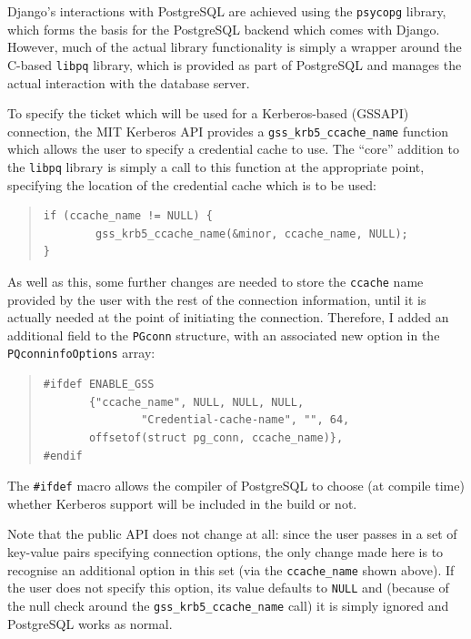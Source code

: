 \documentclass[12pt]{report}
\begin{document}
Django's interactions with PostgreSQL are achieved using the \texttt{psycopg} library, which forms the basis for the PostgreSQL backend which comes with Django. However, much of the actual library functionality is simply a wrapper around the C-based \texttt{libpq} library, which is provided as part of PostgreSQL and manages the actual interaction with the database server.

To specify the ticket which will be used for a Kerberos-based (GSSAPI) connection, the MIT Kerberos API provides a \verb+gss_krb5_ccache_name+ function which allows the user to specify a credential cache to use. The ``core'' addition to the \texttt{libpq} library is simply a call to this function at the appropriate point, specifying the location of the credential cache which is to be used:

\begin{quote}
\begin{verbatim}
if (ccache_name != NULL) {
        gss_krb5_ccache_name(&minor, ccache_name, NULL);
}
\end{verbatim}
\end{quote}

As well as this, some further changes are needed to store the \texttt{ccache} name provided by the user with the rest of the connection information, until it is actually needed at the point of initiating the connection. Therefore, I added an additional field to the \texttt{PGconn} structure, with an associated new option in the \texttt{PQconninfoOptions} array:

\begin{quote}
\begin{verbatim}
#ifdef ENABLE_GSS
       {"ccache_name", NULL, NULL, NULL,
               "Credential-cache-name", "", 64,
       offsetof(struct pg_conn, ccache_name)},
#endif
\end{verbatim}
\end{quote}

The \verb+#ifdef+ macro allows the compiler of PostgreSQL to choose (at compile time) whether Kerberos support will be included in the build or not.

Note that the public API does not change at all: since the user passes in a set of key-value pairs specifying connection options, the only change made here is to recognise an additional option in this set (via the \verb+ccache_name+ shown above). If the user does not specify this option, its value defaults to \texttt{NULL} and (because of the null check around the \verb+gss_krb5_ccache_name+ call) it is simply ignored and PostgreSQL works as normal.
\end{document}
